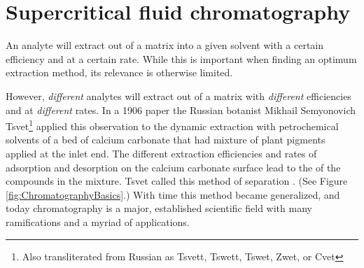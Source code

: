 \section{Supercritical fluid chromatography}

An analyte will extract out of a matrix into a given solvent with a certain
efficiency and at a certain rate. While this is important when finding an
optimum extraction method, its relevance is otherwise limited.

However, \textit{different} analytes will extract out of a matrix with
\textit{different} efficiencies and at \textit{different} rates. In a 1906 paper
the Russian botanist Mikhail Semyonovich Tsvet\footnote{Also transliterated from
Russian as Tsvett, Tswett, Tswet, Zwet, or Cvet} applied this observation to the
dynamic extraction with petrochemical solvents of a bed of calcium carbonate
that had mixture of plant pigments applied at the inlet end. The different
extraction efficiencies and rates of adsorption and desorption on the calcium
carbonate surface lead to the  of the compounds in the
mixture. Tsvet called this method of separation 
\autocite{Ettre1993,Ettre1993a}. (See Figure \ref{fig:ChromatographyBasics}.)
With time this method became generalized, and today chromatography is a major,
established scientific field with many ramifications and a myriad of
applications.

